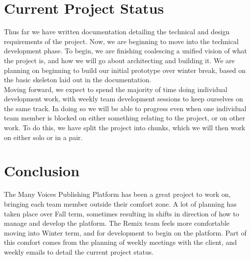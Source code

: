 \documentclass[onecolumn, draftclsnofoot,10pt, compsoc]{IEEEtran}
\begin{document}
\section{Current Project Status}

Thus far we have written documentation detailing the technical and design 
requirements of the project.
Now, we are beginning to move into the technical development phase.
To begin, we are finishing coalescing a unified vision of what the project is, 
and how we will go about architecting and building it.
We are planning on beginning to build our initial prototype over winter break, 
based on the basic skeleton laid out in the documentation. \\

\noindent Moving forward, we expect to spend the majority of time doing 
individual development work, with weekly team development sessions to 
keep ourselves on the same track.
In doing so we will be able to progress even when one individual team 
member is blocked on either something relating to the project, or on other work.
To do this, we have split the project into chunks, which we will then 
work on either solo or in a pair. 



\section{Conclusion}

The Many Voices Publishing Platform has been a great project to work on, 
bringing each team member outside their comfort zone. A lot of planning has 
taken place over Fall term, sometimes resulting in shifts in direction of how 
to manage and develop the platform. The Remix team feels more comfortable moving 
into Winter term, and for development to begin on the platform. Part of this 
comfort comes from the planning of weekly meetings with the client, and weekly 
emails to detail the current project status.
\end{document}
